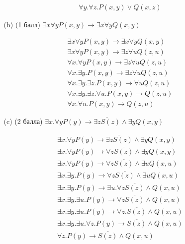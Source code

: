 \begin{enumerate}
\begin{itemize}
\begin{solution}
\begin{align*}
                &\forall y. \forall z . P(x, y) \lor Q(x, z)
            \end{align*}
        \end{solution}
        \item[(b)] (1 балл) $\exists x\forall y P(x, y) \rightarrow \exists x\forall y Q(x, y)$
        \begin{solution}
            \begin{align*}
                &\exists x\forall y P(x, y) \rightarrow \exists x\forall y Q(x, y) \\
                &\exists x\forall y P(x, y) \rightarrow \exists z\forall u Q(z, u) \\
                &\forall x . \forall y P(x, y) \rightarrow \exists z\forall u Q(z, u) \\
                &\forall x . \exists y . P(x, y) \rightarrow \exists z\forall u Q(z, u) \\
                &\forall x . \exists y . \exists z . P(x, y) \rightarrow \forall u Q(z, u) \\
                &\forall x . \exists y . \exists z . \forall u . P(x, y) \rightarrow Q(z, u) \\
                &\forall x . \forall u . P(x, y) \rightarrow Q(z, u)
            \end{align*}
        \end{solution}
        \item[(c)] (2 балла) $\exists x. \forall y P(y) \rightarrow \overline{\exists z S(z)} \land \exists y Q(x, y)$
        \begin{solution}
            \begin{align*}
                &\exists x. \forall y P(y) \rightarrow \overline{\exists z S(z)} \land \exists y Q(x, y) \\
                &\exists x. \forall y P(y) \rightarrow \forall z \overline{S(z)} \land \exists y Q(x, y) \\
                &\exists x. \forall y P(y) \rightarrow \forall z \overline{S(z)} \land \exists u Q(x, u) \\
                &\exists x. \exists y . P(y) \rightarrow \forall z \overline{S(z)} \land \exists u Q(x, u) \\
                &\exists x. \exists y . P(y) \rightarrow \exists u . \forall z \overline{S(z)} \land  Q(x, u) \\
                &\exists x. \exists y . \exists u . P(y) \rightarrow \forall z \overline{S(z)} \land  Q(x, u) \\
                &\exists x. \exists y . \exists u . P(y) \rightarrow \forall z . \overline{S(z)} \land  Q(x, u) \\
                &\exists x. \exists y . \exists u . \forall z . P(y) \rightarrow \overline{S(z)} \land  Q(x, u) \\
                &\forall z . P(y) \rightarrow \overline{S(z)} \land  Q(x, u)
            \end{align*}
        \end{solution}
    \end{itemize}
\end{enumerate}
\clearpage
